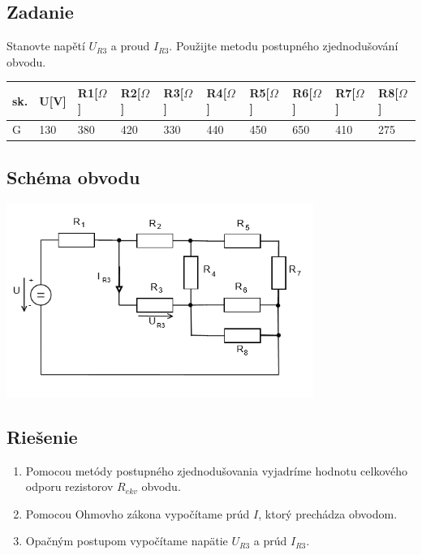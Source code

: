 \documentclass[10pt,a4paper]{article}
\begin{document}
 \subsection*{Zadanie}
 Stanovte napětí $U_{R3}$ a proud $I_{R3}$. Použijte metodu postupného zjednodušování obvodu.
\begin{center}
    \begin{tabular}{ | l | l | l | l | l | l | l | l | l | l | }
    \hline
    sk. & U[V] & R1[$\Omega$] & R2[$\Omega$] & R3[$\Omega$] & R4[$\Omega$] & R5[$\Omega$] & R6[$\Omega$] & R7[$\Omega$] & R8[$\Omega$]\\ \hline
    G & 130 & 380 & 420 & 330 & 440 & 450 & 650 & 410 & 275\\ \hline
    \end{tabular}
\end{center}

\vspace*{1cm}

\subsection*{Schéma obvodu}
 \begin{center}
    \includegraphics[clip, width=10cm]{1.png}
 \end{center}

 
\subsection*{Riešenie}
    \begin{enumerate}
        \item Pomocou metódy postupného zjednodušovania vyjadríme hodnotu celkového odporu rezistorov $R_{ekv}$ obvodu.
        \item Pomocou Ohmovho zákona vypočítame prúd $I$, ktorý prechádza obvodom.
        \item Opačným postupom vypočítame napätie $U_{R3}$ a prúd $I_{R3}$.
    \end{enumerate} \vspace*{1.5cm}
\end{document}
